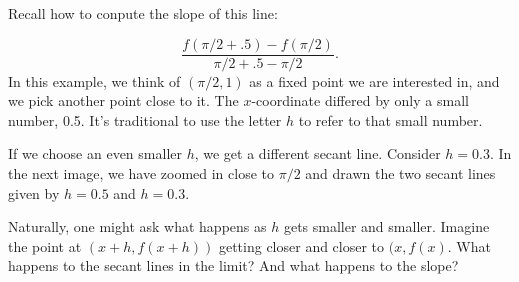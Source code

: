 \documentclass[11pt]{book}
\numberwithin{example}{chapter}
\begin{document}
Recall how to conpute the slope of this line:

$$\frac{f(\pi/2+.5) - f(\pi/2)}{\pi/2+.5 - \pi/2}.$$
In this example, we think of $(\pi/2,1)$ as a fixed point we are interested in, and we pick another point close to it.  The $x$-coordinate differed by only a small number, 0.5.  It's traditional to use the letter $h$ to refer to that small number.  

If we choose an even smaller $h$, we get a different secant line.  Consider $h=0.3$.  In the next image, we have zoomed in close to $\pi/2$ and drawn the two secant lines given by $h=0.5$ and $h=0.3$.  


\begin{center}
\end{center}

Naturally, one might ask what happens as $h$ gets smaller and smaller.  Imagine the point at $(x+h,f(x+h))$ getting closer and closer to $(x,f(x)$.  What happens to the secant lines in the limit?  And what happens to the slope?  
\end{document}
